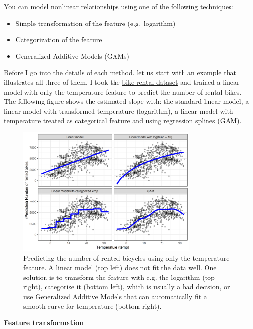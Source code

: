 \documentclass[
  10pt,
]{scrbook}
\providecommand{\tightlist}{%
  \setlength{\itemsep}{0pt}\setlength{\parskip}{0pt}}
\begin{document}
You can model nonlinear relationships using one of the following techniques:

\begin{itemize}
\tightlist
\item
  Simple transformation of the feature (e.g.~logarithm)
\item
  Categorization of the feature
\item
  Generalized Additive Models (GAMs)
\end{itemize}

Before I go into the details of each method, let us start with an example that illustrates all three of them.
I took the \protect\hyperlink{bike-data}{bike rental dataset} and trained a linear model with only the temperature feature to predict the number of rental bikes.
The following figure shows the estimated slope with: the standard linear model, a linear model with transformed temperature (logarithm), a linear model with temperature treated as categorical feature and using regression splines (GAM).

\begin{figure}

{\centering \includegraphics[width=0.8\textwidth]{images/nonlinear-effects-1} 

}

\caption{Predicting the number of rented bicycles using only the temperature feature. A linear model (top left) does not fit the data well. One solution is to transform the feature with e.g. the logarithm (top right), categorize it (bottom left), which is usually a bad decision, or use Generalized Additive Models that can automatically fit a smooth curve for temperature (bottom right).}\label{fig:nonlinear-effects}
\end{figure}

\textbf{Feature transformation}
\end{document}
